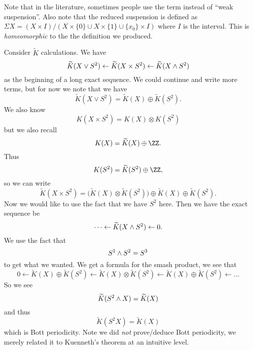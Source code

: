 \begin{ddanger}
Note that in the literature, sometimes people use the term
 instead of ``weak suspension''. Also
note that the reduced suspension is defined as $\Sigma X =
(X\times I)/(X\times\{0\}\cup X\times\{1\}\cup \{x_0\}\times I)$
where $I$ is the interval. This is \emph{homeomorphic} to the the
definition we produced.
\end{ddanger}

Consider $\widetilde{K}$ calculations.
We have
\begin{equation}
\widetilde{K}(X\vee S^2)\gets
\widetilde{K}(X\times S^2)\gets
\widetilde{K}(X\wedge S^{2})
\end{equation}
as the beginning of a long exact sequence. We could continue and
write more terms, but for now we note that we have
\begin{equation}
\widetilde{K}(X\vee S^{2})=\widetilde{K}(X)\oplus\widetilde{K}(S^{2}).
\end{equation}
We also know
\begin{equation}
K(X\times S^2)=K(X)\otimes K(S^2)
\end{equation}
but we also recall
\begin{equation}
K(X)=\widetilde{K}(X)\oplus\ZZ.
\end{equation}
Thus
\begin{equation}
K(S^{2})=\widetilde{K}(S^{2})\oplus\ZZ,
\end{equation}
so we can write
\begin{equation}
\widetilde{K}(X\times S^2)=\bigl(\widetilde{K}(X)\otimes\widetilde{K}(S^2)\bigr)\oplus\widetilde{K}(X)\oplus\widetilde{K}(S^2).
\end{equation}
Now we would like to use the fact that we have $S^{2}$ here.
Then we have the exact sequence be
\begin{equation}
\dots\gets
\widetilde{K}(X\wedge S^2)\gets
0.
\end{equation}
We use the fact that
\begin{equation}
S^1\wedge S^2=S^3
\end{equation}
to get what we wanted. We get a formula for the smash product, we
see that
\begin{equation}
0\gets
\widetilde{K}(X)\oplus\widetilde{K}(S^2)\gets
\widetilde{K}(X)\otimes\widetilde{K}(S^2)\gets
\widetilde{K}(X)\oplus\widetilde{K}(S^2)\gets
\dots
\end{equation}
So we see
\begin{equation}
\widetilde{K}(S^2\wedge X)=\widetilde{K}(X)
\end{equation}
and thus
\begin{equation}
\widetilde{K}(S^2X)=\widetilde{K}(X)
\end{equation}
which is Bott periodicity. Note we did \emph{not} prove/deduce
Bott periodicity, we merely related it to Kuenneth's theorem at
an intuitive level.


